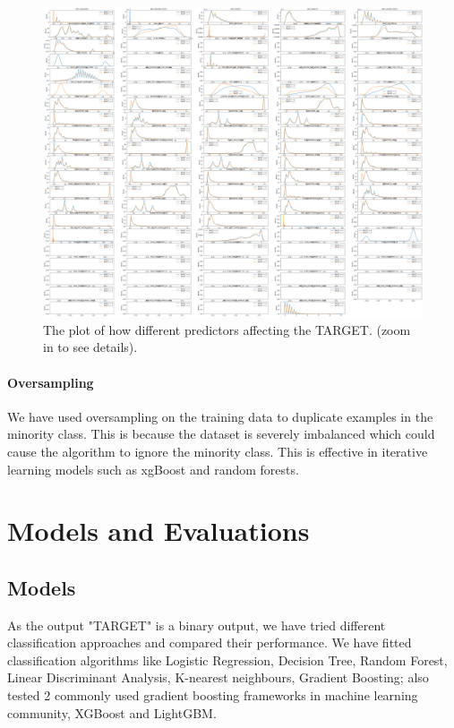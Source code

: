 \documentclass{article}
\begin{document}
\begin{figure}[H]
  \centering
  \includegraphics [width=14cm]{download3.png}
  \caption{The plot of how different predictors affecting the TARGET. (zoom in to see details).}
\end{figure}


\paragraph{Oversampling} \mbox{}

We have used oversampling on the training data to duplicate examples in the minority class. This is because the dataset is severely imbalanced which could cause the algorithm to ignore the minority class. This is effective in iterative learning models such as xgBoost and random forests.

\mbox{}

\section{Models and Evaluations}



\subsection{Models}

As the output "TARGET" is a binary output, we have tried different classification approaches and compared their performance.
We have fitted classification algorithms like Logistic Regression, Decision Tree, Random Forest, Linear Discriminant Analysis, K-nearest neighbours, Gradient Boosting; also tested 2 commonly used gradient boosting frameworks in machine learning community, XGBoost and LightGBM.
		
\end{document}
